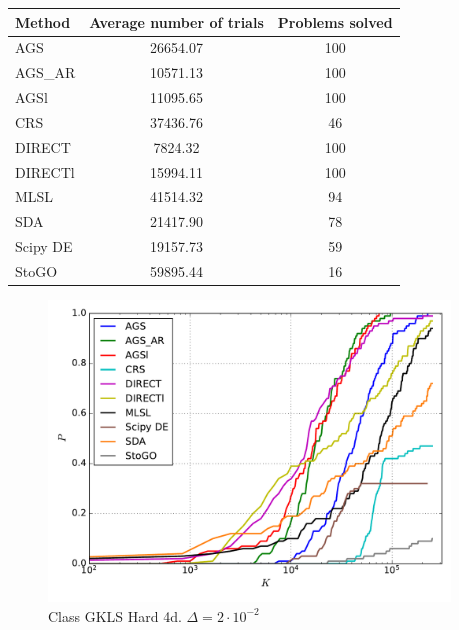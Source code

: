 \documentclass[a4paper]{article}
\begin{document}
\begin{tabular}{lcc}
\hline
 Method   &  Average number of trials  &  Problems solved  \\
\hline
 AGS      &          26654.07          &        100        \\
 AGS\_AR   &          10571.13          &        100        \\
 AGSl     &          11095.65          &        100        \\
 CRS      &          37436.76          &        46         \\
 DIRECT   &          7824.32           &        100        \\
 DIRECTl  &          15994.11          &        100        \\
 MLSL     &          41514.32          &        94         \\
 SDA      &          21417.90          &        78         \\
 Scipy DE &          19157.73          &        59         \\
 StoGO    &          59895.44          &        16         \\
\hline
\end{tabular}
\begin{figure}[H]
  \center
  \includegraphics[width=0.95\textwidth]{../experiments/gklsh4d/cmc.pdf}
  \caption{Class GKLS Hard 4d. $\Delta=2\cdot10^{-2}$}
\end{figure}
\end{document}
